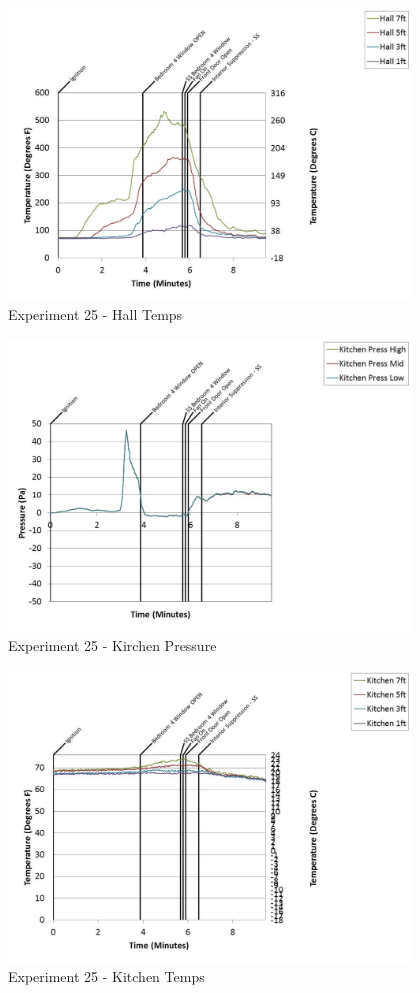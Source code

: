 \documentclass{article}
\begin{document}
\begin{appendices}
	\clearpage

	\begin{figure}[h!]
		\centering
		\includegraphics[height=3.05in]{0_Images/Results_Charts/Exp_25_Charts/HallTemps.pdf}
		\caption{Experiment 25 - Hall Temps}
	\end{figure}
 

	\begin{figure}[h!]
		\centering
		\includegraphics[height=3.05in]{0_Images/Results_Charts/Exp_25_Charts/KirchenPressure.pdf}
		\caption{Experiment 25 - Kirchen Pressure}
	\end{figure}
 
	\clearpage

	\begin{figure}[h!]
		\centering
		\includegraphics[height=3.05in]{0_Images/Results_Charts/Exp_25_Charts/KitchenTemps.pdf}
		\caption{Experiment 25 - Kitchen Temps}
	\end{figure}
 


\end{appendices}
\end{document}

